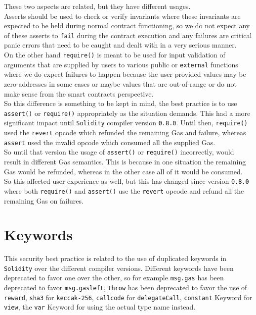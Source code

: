 These two aspects are related, but they have different usages. \\

Asserts should be used to check or verify invariants where these invariants are expected to be held during normal contract functioning, so we do not expect any of these asserts to \texttt{fail} during the contract execution and any failures are critical panic errors that need to be caught and dealt with in a very serious manner.\\

On the other hand \texttt{require()} is meant to be used for input validation of arguments that are supplied by users to various public or \texttt{external} functions where we do expect failures to happen because the user provided values may be zero-addresses in some cases or maybe values that are out-of-range or do not make sense from the smart contracts perspective.\\

So this difference is something to be kept in mind, the best practice is to use \texttt{assert()} or \texttt{require()} appropriately as the situation demands. This had a more significant impact until \texttt{Solidity} compiler version \texttt{0.8.0}. Until then, \texttt{require()} used the \texttt{revert} opcode which refunded the remaining Gas and failure, whereas \texttt{assert} used the invalid opcode which consumed all the supplied Gas.\\

So until that version the usage of \texttt{assert()} or \texttt{require()} incorrectly, would result in different Gas semantics. This is because in one situation the remaining Gas would be refunded, whereas in the other case all of it would be consumed.\\

So this affected user experience as well, but this has changed since version \texttt{0.8.0} where both \texttt{require()} and \texttt{assert()} use the \texttt{revert} opcode and refund all the remaining Gas on failures.

\section{Keywords}

This security best practice is related to the use of duplicated keywords in \texttt{Solidity} over the different compiler versions. Different keywords have been deprecated to favor one over the other, so for example \texttt{msg.gas} has been deprecated to favor \texttt{msg.gasleft}, \texttt{throw} has been deprecated to favor the use of \texttt{reward}, \texttt{sha3} for \texttt{keccak-256}, \texttt{callcode} for \texttt{delegateCall}, \texttt{constant} Keyword for \texttt{view}, the \texttt{var} Keyword for using the actual type name instead.\\

